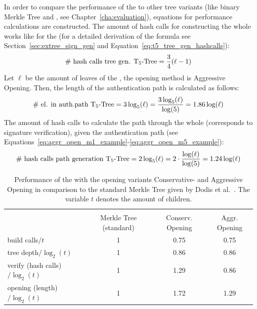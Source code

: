 In order to compare the performance of the \tftree to other tree variants (like binary Merkle Tree and \extree, see Chapter~\ref{cha:evaluation}), equations for performance calculations are constructed. 
The amount of hash calls for constructing the whole \tftree works like for the \extree (for a detailed derivation of the formula see Section~\ref{sec:extree_sign_gen} and Equation~\ref{eq:t5_tree_gen_hashcalls}):
\begin{equation}
\text{\# hash calls tree gen. T$_5$-Tree} = \frac{3}{4}(\ell-1)
\end{equation}
Let $\ell$ be the amount of leaves of the \tftree, the opening method is Aggressive Opening. Then, the length of the authentication path is calculated as follows:
\begin{equation}
\label{eq:t5_el_authpath}
\text{\# el. in auth.path T$_5$-Tree} = 3\log_5(\ell) = \frac{3\log_5(\ell)}{\log(5)} = 1.86\log(\ell)
\end{equation}
The amount of hash calls to calculate the path through the whole \tftree (corresponds to signature verification), given the authentication path (see Equations~\ref{eq:aggr_open_m1_example}-\ref{eq:aggr_open_m5_example}):
\begin{equation}
\label{eq:t5_path_calc_hashcalls}
\text{\# hash calls path generation T$_5$-Tree} = 2\log_5(\ell) = 2 \cdot \frac{\log(\ell)}{\log(5)} = 1.24\log(\ell)
\end{equation}

\begin{table}
\centering
\begin{tabular}{l c c c} 
 \hline\noalign{\smallskip}
 \multicolumn{4}{c}{\textbf{\tftree Performance}} \\
 \noalign{\smallskip}
 & Merkle Tree (standard) & Conserv. Opening &  Aggr. Opening \\
 \hline\noalign{\smallskip}
 build calls$/t$ & 1 & 0.75 & 0.75 \\
 tree depth$/\log_2(t)$ & 1 & 0.86 & 0.86 \\
 verify (hash calls)$/\log_2(t)$ & 1 & 1.29 & 0.86 \\
 opening (length)$/\log_2(t)$ & 1 & 1.72 & 1.29 \\ 
 \hline
\end{tabular}
\caption{Performance of the \tftree with the opening variants Conservative- and Aggressive Opening in comparison to the standard Merkle Tree given by Dodis et al.~\cite{T5_paper}. The variable $t$ denotes the amount of children.}
\label{table:t5_merkletree_dodis_performance}
\end{table}


